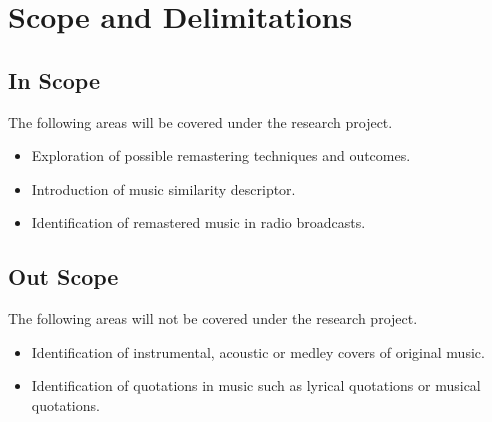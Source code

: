 \section{Scope and Delimitations}

\subsection{In Scope}
The following areas will be covered under the research project.
\begin{itemize}
    \item Exploration of possible remastering techniques and outcomes. 
    \item Introduction of music similarity descriptor.
    \item Identification of remastered music in radio broadcasts.
\end{itemize}

\subsection{Out Scope}
The following areas will not be covered under the research project.
\begin{itemize}
    \item Identification of instrumental, acoustic or medley covers of original music. 
    \item Identification of quotations in music such as lyrical quotations or musical quotations.
\end{itemize}
